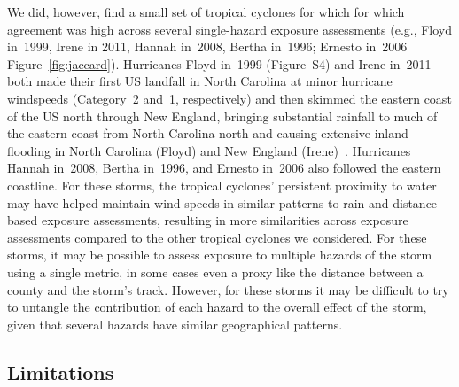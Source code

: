 We did, however, find a small set of tropical cyclones for which for
which agreement was high across several single-hazard exposure assessments
(e.g., Floyd in~1999, Irene in 2011, Hannah in~2008, Bertha in~1996; Ernesto
in~2006 Figure~\ref{fig:jaccard}).  Hurricanes Floyd in~1999 (Figure~S4) and
Irene in~2011 both made their first \ac{US} landfall in North Carolina at minor
hurricane windspeeds (Category~2 and~1, respectively) and then skimmed the
eastern coast of the \ac{US} north through New England, bringing substantial
rainfall to much of the eastern coast from North Carolina north and causing
extensive inland flooding in North Carolina (Floyd) and New England
(Irene)~\parencite{avila2013atlantic, lawrence2000atlantic}.  Hurricanes Hannah
in~2008, Bertha in~1996, and Ernesto in~2006 also followed the eastern
coastline. For these storms, the tropical cyclones' persistent proximity
to water may have helped maintain wind speeds in similar patterns to rain and
distance-based exposure assessments, resulting in more similarities across
exposure assessments compared to the other tropical cyclones we considered.
For these storms, it may be possible to assess exposure to multiple hazards of
the storm using a single metric, in some cases even a proxy like the distance
between a county and the storm's track.  However, for these storms it may be
difficult to try to untangle the contribution of each hazard to the overall
effect of the storm, given that several hazards have similar geographical
patterns. 

\subsection*{Limitations}

